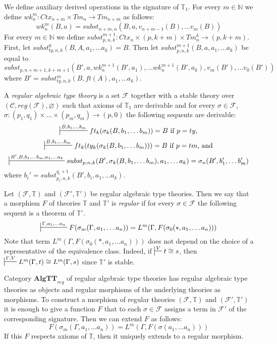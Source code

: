 \documentclass{amsart}
\theoremstyle{definition}
\theoremstyle{remark}
\newcommand{\cat}[1]{\mathbf{#1}}
\newcommand{\algtt}{\cat{AlgTT}}
\numberwithin{figure}{section}
\begin{document}
We define auxiliary derived operations in the signature of $\mathbb{T}_1$.
For every $m \in \mathbb{N}$ we define $wk^m_n : Ctx_{n+m} \times Tm_n \to Tm_{n+m}$ as follows:
\[ wk^m_n(B,a) = subst_{n+m,n}(B, a, v_{n+m-1}(B), \ldots v_m(B)) \]
For every $m \in \mathbb{N}$ we define $subst^{m+1}_{p,n,k} : Ctx_n \times (p,k+m) \times Tm^k_n \to (p,k+m)$.
First, let $subst^0_{ty,n,k}(B, A, a_1, \ldots a_k) = B$.
Then let $subst^{m+1}_{p,n,k}(B, a, a_1, \ldots a_k)$ be equal to
\[ subst_{p,n+m+1,k+m+1}(B', a, wk^{m+1}_n(B', a_1), \ldots wk^{m+1}_n(B', a_k), v_m(B'), \ldots v_0(B')) \]
where $B' = subst^m_{ty,n,k}(B, ft(A), a_1, \ldots a_k)$.

\begin{defn}
A \emph{regular algebraic type theory} is a set $\mathcal{F}$ together with a stable theory over $(\mathcal{C}, reg(\mathcal{F}), \varnothing)$
such that axioms of $\mathbb{T}_1$ are derivable and for every $\sigma \in \mathcal{F}$, $\sigma : (p_1,q_1) \times \ldots \times (p_m,q_m) \to (p,0)$ the following sequents are derivable:
\[ \sststile{}{B, b_1, \ldots b_m} ft_k(\sigma_k(B, b_1, \ldots b_m)) = B \text{ if $p = ty$,} \]
\[ \sststile{}{B, b_1, \ldots b_m} ft_k(ty_k(\sigma_k(B, b_1, \ldots b_m))) = B \text{ if $p = tm$, and} \]
\[ \sststile{}{B', B, b_1, \ldots b_m, a_1, \ldots a_k} subst_{p,n,k}(B', \sigma_k(B, b_1, \ldots b_m), a_1, \ldots a_k) = \sigma_n(B', b_1', \ldots b_m') \]
where $b_i' = subst_{p_i,n,k}^{q_i+1}(B', b_i, a_1, \ldots a_k)$.
\end{defn}

Let $(\mathcal{F},\mathbb{T})$ and $(\mathcal{F}',\mathbb{T}')$ be regular algebraic type theories.
Then we say that a morphism $F$ of theories $\mathbb{T}$ and $\mathbb{T}'$ is \emph{regular} if for every $\sigma \in \mathcal{F}$ the following sequent is a theorem of $\mathbb{T}'$.
\[ \sststile{}{\Gamma, a_1, \ldots a_n} F(\sigma_m(\Gamma, a_1, \ldots a_n)) = L^m(\Gamma, F(\sigma_0(*, a_1, \ldots a_n))) \]
Note that term $L^m(\Gamma, F(\sigma_0(*, a_1, \ldots a_n)))$ does not depend on the choice of a representative of the equivalence class.
Indeed, if $\sststile{}{V} t \cong s$, then $\sststile{}{\Gamma,V} L^m(\Gamma,t) \cong L^m(\Gamma,s)$ since $\mathbb{T}'$ is stable.

Category $\algtt_{reg}$ of regular algebraic type theories has regular algebraic type theories as objects and regular morphisms of the underlying theories as morphisms.
To construct a morphism of regular theories $(\mathcal{F},\mathbb{T})$ and $(\mathcal{F}',\mathbb{T}')$ it is enough to give a function $F$ that to each $\sigma \in \mathcal{F}$ assigns a term in $\mathcal{F}'$ of the corresponding signature.
Then we can extend $F$ as follows:
\[ F(\sigma_m(\Gamma, a_1, \ldots a_n)) = L^m(\Gamma, F(\sigma(a_1, \ldots a_n))) \]
If this $F$ respects axioms of $\mathbb{T}$, then it uniquely extends to a regular morphism.
\end{document}
